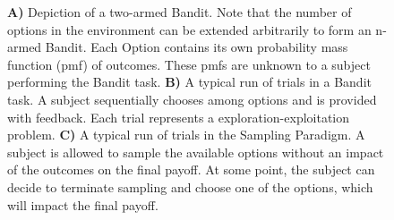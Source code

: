 \documentclass[
	12pt,
	oneside,
	bibliography=totocnumbered]{scrartcl}
\newcommand\sideAdj{13}
\begin{document}
\begin{figure}[t]
\begin{center}
{
} %

\captionsetup{width=.9\linewidth, format=plain}
\caption[Experimental Paradigms]{\textbf{A)} Depiction of a two-armed Bandit. Note that the number of options in the environment can be extended arbitrarily to form an n-armed Bandit. Each Option contains its own probability mass function (pmf) of outcomes. These pmfs are unknown to a subject performing the Bandit task. \textbf{B)} A typical run of trials in a Bandit task. A subject sequentially chooses among options and is provided with feedback. Each trial represents a exploration-exploitation problem.  \textbf{C)} A typical run of trials in the Sampling Paradigm. A subject is allowed to sample the available options without an impact of the outcomes on the final payoff. At some point, the subject can decide to terminate sampling and choose one of the options, which will impact the final payoff.}
\label{fig:paradigms}
\end{center}
\end{figure}
\end{document}
